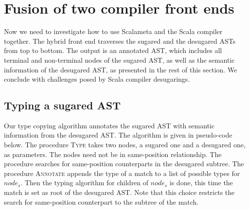 \documentclass[11pt]{amsart}
\begin{document}
\section{Fusion of two compiler front ends}
\label{sec:alg}




Now we need to investigate how to use Scalameta and the
Scala compiler together. The hybrid front end traverses the
sugared and the desugared ASTs from top to bottom. The output is an annotated
AST, which includes all terminal and non-terminal nodes of the sugared
AST, as well as the semantic information of the desugared AST, as presented
in the rest of
this section.
We conclude with challenges posed
by Scala compiler desugarings.

\subsection{Typing a sugared AST}
\label{sec:typing}

Our type copying algorithm annotates the sugared AST with semantic
information from the desugared AST. 
The algorithm is given in pseudo-code below. The procedure
\textsc{Type} takes two nodes, a sugared one and a desugared one, as
parameters. The nodes need not be in same-position
relationship. The procedure searches for same-position counterparts in
the desugared subtree. The procedure \textsc{Annotate} appends the
type of a match to a list of possible types for $node_s$. Then the
typing algorithm for children of $node_s$ is done, this time the match
is set as root of the desugared AST. Note that this choice restricts
the search for same-position counterpart to the subtree of the match.
\end{document}
